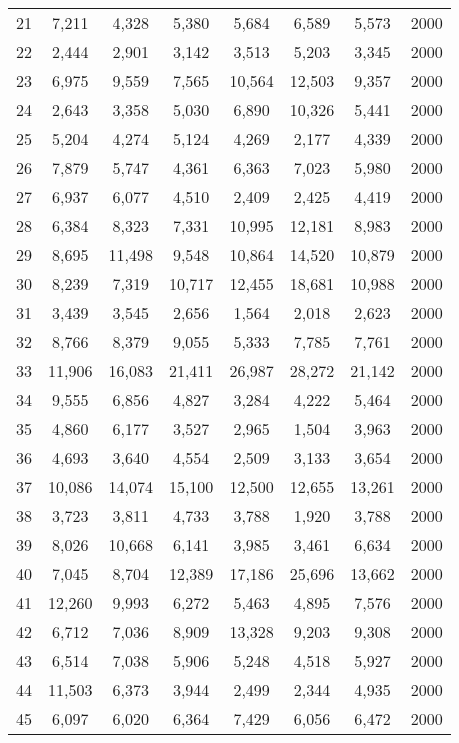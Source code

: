 \begin{longtable}{cccccccc}
21  & 7,211  & 4,328  & 5,380  & 5,684  & 6,589  & 5,573  & 2000 \\
22  & 2,444  & 2,901  & 3,142  & 3,513  & 5,203  & 3,345  & 2000 \\
23  & 6,975  & 9,559  & 7,565  & 10,564 & 12,503 & 9,357  & 2000 \\
24  & 2,643  & 3,358  & 5,030  & 6,890  & 10,326 & 5,441  & 2000 \\
25  & 5,204  & 4,274  & 5,124  & 4,269  & 2,177  & 4,339  & 2000 \\
26  & 7,879  & 5,747  & 4,361  & 6,363  & 7,023  & 5,980  & 2000 \\
27  & 6,937  & 6,077  & 4,510  & 2,409  & 2,425  & 4,419  & 2000 \\
28  & 6,384  & 8,323  & 7,331  & 10,995 & 12,181 & 8,983  & 2000 \\
29  & 8,695  & 11,498 & 9,548  & 10,864 & 14,520 & 10,879 & 2000 \\
30  & 8,239  & 7,319  & 10,717 & 12,455 & 18,681 & 10,988 & 2000 \\
31  & 3,439  & 3,545  & 2,656  & 1,564  & 2,018  & 2,623  & 2000 \\
32  & 8,766  & 8,379  & 9,055  & 5,333  & 7,785  & 7,761  & 2000 \\
33  & 11,906 & 16,083 & 21,411 & 26,987 & 28,272 & 21,142 & 2000 \\
34  & 9,555  & 6,856  & 4,827  & 3,284  & 4,222  & 5,464  & 2000 \\
35  & 4,860  & 6,177  & 3,527  & 2,965  & 1,504  & 3,963  & 2000 \\
36  & 4,693  & 3,640  & 4,554  & 2,509  & 3,133  & 3,654  & 2000 \\
37  & 10,086 & 14,074 & 15,100 & 12,500 & 12,655 & 13,261 & 2000 \\
38  & 3,723  & 3,811  & 4,733  & 3,788  & 1,920  & 3,788  & 2000 \\
39  & 8,026  & 10,668 & 6,141  & 3,985  & 3,461  & 6,634  & 2000 \\
40  & 7,045  & 8,704  & 12,389 & 17,186 & 25,696 & 13,662 & 2000 \\
41  & 12,260 & 9,993  & 6,272  & 5,463  & 4,895  & 7,576  & 2000 \\
42  & 6,712  & 7,036  & 8,909  & 13,328 & 9,203  & 9,308  & 2000 \\
43  & 6,514  & 7,038  & 5,906  & 5,248  & 4,518  & 5,927  & 2000 \\
44  & 11,503 & 6,373  & 3,944  & 2,499  & 2,344  & 4,935  & 2000 \\
45  & 6,097  & 6,020  & 6,364  & 7,429  & 6,056  & 6,472  & 2000 \\

\end{longtable}
